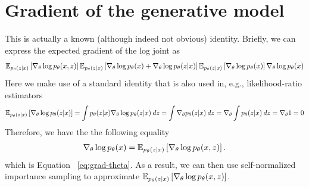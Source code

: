 \documentclass{article}
\theoremstyle{definition}
\begin{document}






\newpage
\appendix
\onecolumn
{}
\section{Gradient of the generative model}%
\label{appendix:grad-theta}
This is actually a known (although indeed not obvious) identity. Briefly, we can express the expected gradient of the log joint as
\begin{align*}
    \mathbb{E}_{p_\theta(z | x)} 
    \left[
    \nabla_\theta \log p_\theta(x, z)
    \right]
    \mathbb{E}_{p_\theta(z | x)} 
    \left[
    \nabla_\theta \log p_\theta(x) + \nabla_\theta \log p_\theta(z | x)
    \right]
    \mathbb{E}_{p_\theta(z | x)} 
    \left[
    \nabla_\theta \log p_\theta(x) 
    \right]
    \nabla_\theta \log p_\theta(x)
\end{align*}
Here we make use of a standard identity that is also used in, e.g., likelihood-ratio estimators
\begin{align*}
\mathbb{E}_{p_\theta(z | x)}
\left[
    \nabla_\theta \log p_\theta(z | x)
\right] 
=
\int p_\theta(z | x) \nabla_\theta \log p_\theta(z | x) \: dz
=
\int \nabla_\theta p_\theta(z | x) \: dz
=
\nabla_\theta \int p_\theta(z | x) \: dz
=
\nabla_\theta 1
= 
0
\end{align*}
Therefore, we have the the following equality
\begin{align*}
\nabla_\theta \log p_\theta(x) 
= 
\mathbb{E}_{p_\theta(z | x)} 
\left[
\nabla_\theta \log p_\theta(x, z)
\right].
\end{align*}
which is Equation ~\ref{eq:grad-theta}. As a result, we can then use self-normalized importance sampling to approximate     $\mathbb{E}_{p_\theta(z | x)} \left[\nabla_\theta \log p_\theta(x, z) \right]$.
\end{document}
